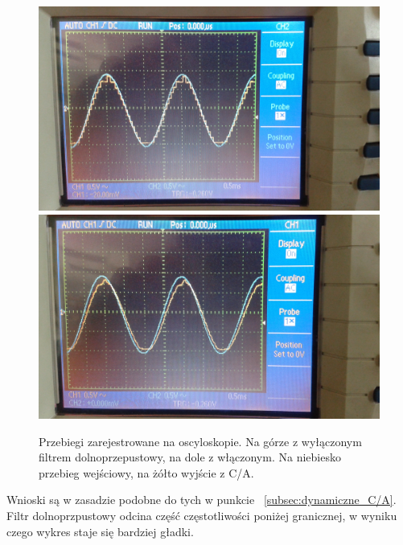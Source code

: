 \documentclass{article}
\begin{document}
\begin{figure}[h!]
	\centering
	\includegraphics[scale=0.1]{img5}
	\includegraphics[scale=0.1]{img6}
	\caption{Przebiegi zarejestrowane na oscyloskopie. Na górze z wyłączonym filtrem dolnoprzepustowy, na dole z włączonym. Na niebiesko przebieg wejściowy, na żółto wyjście z C/A.}
\end{figure}

Wnioski są w zasadzie podobne do tych w punkcie ~\ref{subsec:dynamiczne_C/A}. Filtr dolnoprzpustowy odcina część częstotliwości poniżej granicznej, w wyniku czego wykres staje się bardziej gładki.






\end{document}
